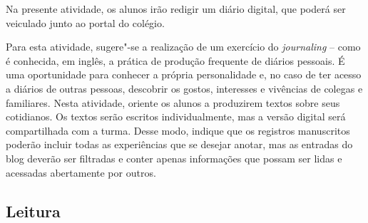 \documentclass[12pt]{extarticle}
\begin{document}
Na presente atividade, os alunos irão redigir um diário digital, que
poderá ser veiculado junto ao portal do colégio.

Para esta atividade, sugere"-se a realização de um exercício do
\emph{journaling} -- como é conhecida, em inglês, a prática de produção
frequente de diários pessoais. É uma oportunidade para conhecer a
própria personalidade e, no caso de ter acesso a diários de outras
pessoas, descobrir os gostos, interesses e vivências de colegas e
familiares. Nesta atividade, oriente os alunos a produzirem textos sobre
seus cotidianos. Os textos serão escritos individualmente, mas a versão
digital será compartilhada com a turma. Desse modo, indique que os
registros manuscritos poderão incluir todas as experiências que se
desejar anotar, mas as entradas do blog deverão ser filtradas e conter
apenas informações que possam ser lidas e acessadas abertamente por
outros.

\subsection{Leitura}


\end{document}
